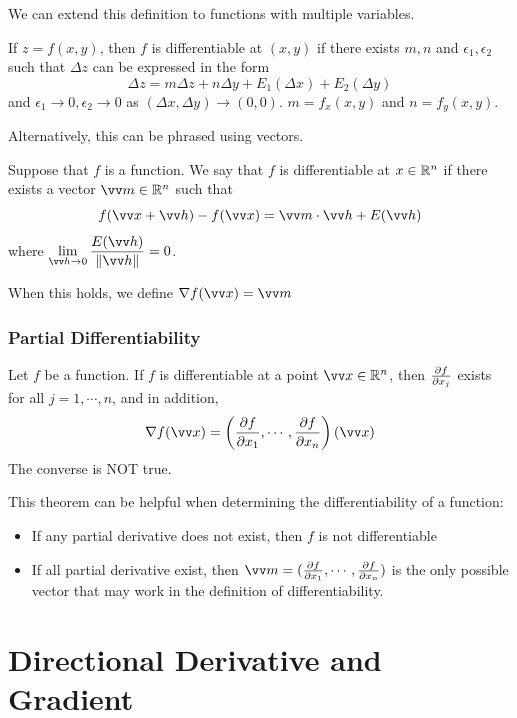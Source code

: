 We can extend this definition to functions with multiple variables.

\begin{definition}
If $z=f(x,y)$, then $f$ is differentiable at $(x,y)$ if there exists $m,n$ and $\epsilon_1, \epsilon_2$ such that $\Delta z$ can be expressed in the form
$$
\Delta z = m \Delta z + n \Delta y + E_1(\Delta x) + E_2(\Delta y)
$$
and $\epsilon_1 \to 0, \epsilon_2 \to 0$ as $(\Delta x, \Delta y) \to (0,0)$. $m=f_x(x,y)$ and $n=f_y(x,y)$.
\end{definition}

Alternatively, this can be phrased using vectors.
\begin{definition}
Suppose that $f$ is a function. We say that $f$ is differentiable at $x \in {\mathbb R}^n$ if there exists a vector $\vv m \in \R^n$ such that
$$
f(\vv x + \vv h) - f(\vv x) = \vv m \cdot \vv h + E(\vv h)
$$
where $\displaystyle \lim_{\vv h \to 0} \frac{E(\vv h)}{\norm{\vv h}} = 0$.

When this holds, we define $\nabla f(\vv x) = \vv m$
\end{definition}

\subsubsection{Partial Differentiability}

\begin{theorem}
Let $f$ be a function. If $f$ is differentiable at a point $\vv x \in \R^n$, then $\frac{\partial f}{\partial x_j}$ exists for all $j = 1,\cdots, n$, and in addition,
$$
\nabla f(\vv x) = \left(\partialderiv{f}{x_1},\cdots,\partialderiv{f}{x_n}\right)(\vv x)
$$
The converse is NOT true.
\end{theorem}

This theorem can be helpful when determining the differentiability of a function:
\begin{itemize}
    \item If any partial derivative does not exist, then $f$ is not differentiable
    \item If all partial derivative exist, then $\vv m = (\partialderiv{f}{x_1},\cdots,\partialderiv{f}{x_n})$ is the only possible vector that may work in the definition of differentiability.
\end{itemize}

\section{Directional Derivative and Gradient}

